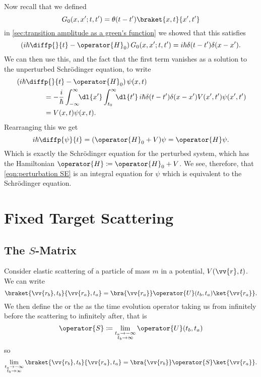 \documentclass[fleqn]{NotesClass}
\newcommand*{\hamiltonian}{H}
\begin{document}
    Now recall that we defined
    \begin{equation}
        G_0(x, x'; t, t') = \theta(t - t') \braket{x, t}{x', t'}
    \end{equation}
    in \cref{sec:transition amplitude as a green's function} we showed that this satisfies
    \begin{equation}
        \left( i\hbar\diffp{}{t} - \operator{\hamiltonian}_0 \right)G_0(x, x'; t, t') = i\hbar\delta(t - t')\delta(x - x').
    \end{equation}
    We can then use this, and the fact that the first term vanishes as a solution to the unperturbed Schr\"odinger equation, to write
    \begin{align}
        &\left( i\hbar\diffp{}{t} - \operator{\hamiltonian}_0 \right)\psi(x, t)\notag\\
        &\qquad\qquad= -\frac{i}{\hbar} \int_{-\infty}^{\infty} \!\! \dl{x'} \int_{t_0}^{\infty} \!\! \dl{t'} \, i\hbar \delta(t - t')\delta(x - x') V(x', t')\psi(x', t')\\
        &\qquad\qquad= V(x, t)\psi(x, t).
    \end{align}
    Rearranging this we get
    \begin{equation}
        i\hbar\diffp{\psi}{t} = (\operator{\hamiltonian}_0 + V)\psi = \operator{\hamiltonian}\psi.
    \end{equation}
    Which is exactly the Schr\"odinger equation for the perturbed system, which has the Hamiltonian \(\operator{\hamiltonian} \coloneqq \operator{\hamiltonian}_0 + V\).
    We see, therefore, that \cref{eqn:perturbation SE} is an integral equation for \(\psi\) which is equivalent to the Schr\"odinger equation.
    
    \chapter{Fixed Target Scattering}
    \section{The \texorpdfstring{\(S\)}{S}-Matrix}
    Consider elastic scattering of a particle of mass \(m\) in a potential, \(V(\vv{r}, t)\).
    We can write
    \begin{equation}
        \braket{\vv{r_b}, t_b}{\vv{r_a}, t_a} = \bra{\vv{r_a}} \operator{U}(t_b, t_a) \ket{\vv{r_a}}.
    \end{equation}
    We then define the  or the  as the time evolution operator taking us from infinitely before the scattering to infinitely after, that is
    \begin{equation}
        \operator{S} \coloneqq \lim_{\substack{t_a\to-\infty\\t_b\to\infty}} \operator{U}(t_b, t_a)
    \end{equation}
    so
    \begin{equation}
        \lim_{\substack{t_a\to-\infty\\t_b\to\infty}} \braket{\vv{r_b}, t_b}{\vv{r_a}, t_a} = \bra{\vv{r_b}} \operator{S} \ket{\vv{r_a}}.
    \end{equation}
    
\end{document}
